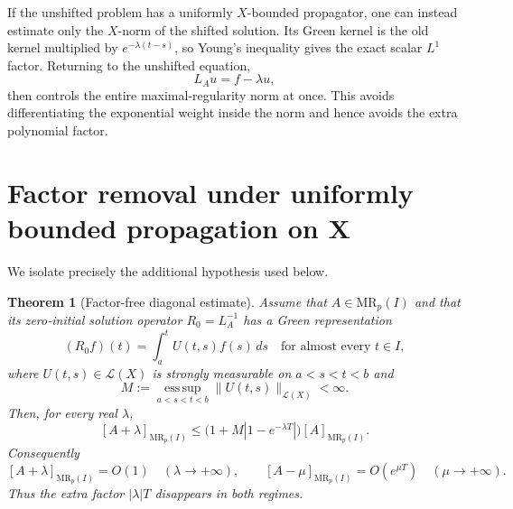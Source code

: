 \documentclass[11pt]{article}
\newtheorem{theorem}{Theorem}
\newcommand{\Lin}{\mathcal L}
\begin{document}
If the unshifted problem has a uniformly $X$-bounded propagator, one can
instead estimate only the $X$-norm of the shifted solution.  Its Green kernel
is the old kernel multiplied by $e^{-\lambda(t-s)}$, so Young's inequality
gives the exact scalar $L^1$ factor.  Returning to the unshifted equation,
\[
 L_Au=f-\lambda u,
\]
then controls the entire maximal-regularity norm at once.  This avoids
differentiating the exponential weight inside the norm and hence avoids the
extra polynomial factor.

\section{Factor removal under uniformly bounded propagation on X}

We isolate precisely the additional hypothesis used below.

\begin{theorem}[Factor-free diagonal estimate]\label{thm:main}
Assume that $A\in\mathrm{MR}_p(I)$ and that its zero-initial solution
operator $R_0=L_A^{-1}$ has a Green representation
\[
 (R_0f)(t)=\int_a^t U(t,s)f(s)\,ds
 \quad\text{for almost every }t\in I,
 \tag{1}
\]
where $U(t,s)\in\Lin(X)$ is strongly measurable on $a<s<t<b$ and
\[
 M:=\operatorname*{ess\,sup}_{a<s<t<b}\|U(t,s)\|_{\Lin(X)}<\infty.
 \tag{2}
\]
Then, for every real $\lambda$,
\[
 \boxed{
 [A+\lambda]_{\mathrm{MR}_p(I)}
 \le \bigl(1+M|1-e^{-\lambda T}|\bigr)
       [A]_{\mathrm{MR}_p(I)}.}
 \tag{3}
\]
Consequently
\[
 [A+\lambda]_{\mathrm{MR}_p(I)}=O(1)
       \quad(\lambda\to+\infty),
 \qquad
 [A-\mu]_{\mathrm{MR}_p(I)}=O(e^{\mu T})
       \quad(\mu\to+\infty).
\]
Thus the extra factor $|\lambda|T$ disappears in both regimes.
\end{theorem}
\end{document}
